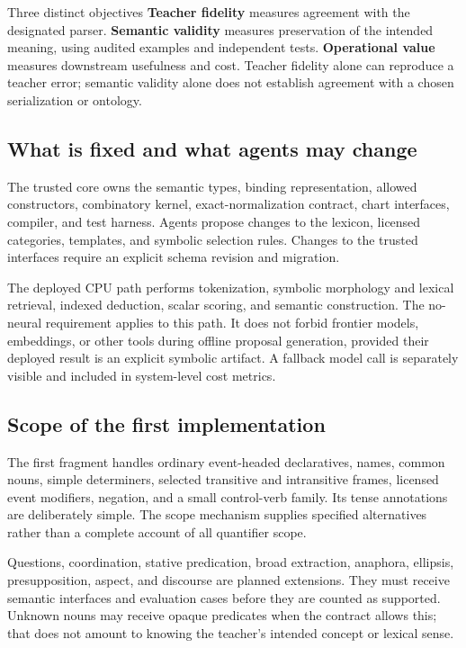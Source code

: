 \documentclass[11pt,a4paper]{article}
\begin{document}
\begin{designbox}{Three distinct objectives}
\textbf{Teacher fidelity} measures agreement with the designated parser.
\textbf{Semantic validity} measures preservation of the intended meaning,
using audited examples and independent tests.
\textbf{Operational value} measures downstream usefulness and cost.
Teacher fidelity alone can reproduce a teacher error; semantic validity alone
does not establish agreement with a chosen serialization or ontology.
\end{designbox}

\subsection{What is fixed and what agents may change}
The trusted core owns the semantic types, binding representation, allowed
constructors, combinatory kernel, exact-normalization contract, chart
interfaces, compiler, and test harness. Agents propose changes to the lexicon,
licensed categories, templates, and symbolic selection rules. Changes to the
trusted interfaces require an explicit schema revision and migration.

The deployed CPU path performs tokenization, symbolic morphology and lexical
retrieval, indexed deduction, scalar scoring, and semantic construction.
The no-neural requirement applies to this path. It does not forbid frontier
models, embeddings, or other tools during offline proposal generation,
provided their deployed result is an explicit symbolic artifact. A fallback
model call is separately visible and included in system-level cost metrics.

\subsection{Scope of the first implementation}
The first fragment handles ordinary event-headed declaratives, names,
common nouns, simple determiners, selected transitive and intransitive frames,
licensed event modifiers, negation, and a small control-verb family. Its tense
annotations are deliberately simple. The scope mechanism supplies specified
alternatives rather than a complete account of all quantifier scope.

Questions, coordination, stative predication, broad extraction, anaphora,
ellipsis, presupposition, aspect, and discourse are planned extensions. They
must receive semantic interfaces and evaluation cases before they are counted
as supported. Unknown nouns may receive opaque predicates when the contract
allows this; that does not amount to knowing the teacher's intended concept
or lexical sense.
\end{document}
